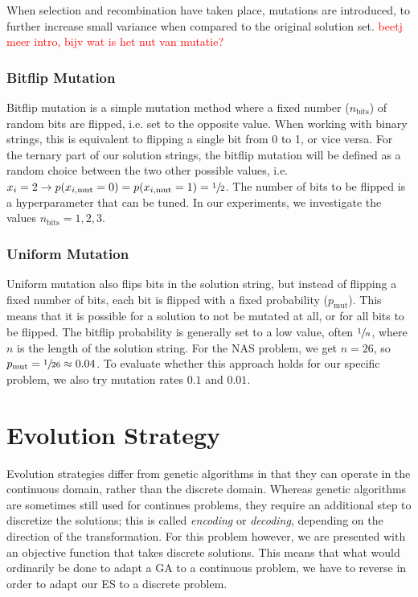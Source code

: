 \documentclass{article}
\newcommand{\todo}[1]{\textcolor{red}{#1}}
\begin{document}
When selection and recombination have taken place, mutations are introduced, to further increase small variance when compared to the original solution set.
\todo{beetj meer intro, bijv wat is het nut van mutatie?}

\subsubsection*{Bitflip Mutation}
\label{subsubsec:ga_mut_bf}
Bitflip mutation is a simple mutation method where a fixed number ($n_{\mathrm{bits}}$) of random bits are flipped, i.e. set to the opposite value.
When working with binary strings, this is equivalent to flipping a single bit from 0 to 1, or vice versa.
For the ternary part of our solution strings, the bitflip mutation will be defined as a random choice between the two other possible values, i.e. $ x_i = 2 \rightarrow p(x_{i,\mathrm{mut}} = 0) = p(x_{i, \mathrm{mut}} = 1) = \sfrac{1}{2}$.
The number of bits to be flipped is a hyperparameter that can be tuned.
In our experiments, we investigate the values $n_{\mathrm{bits}}=1, 2, 3$.

\subsubsection*{Uniform Mutation}
\label{subsubsec:ga_mut_um}
Uniform mutation also flips bits in the solution string, but instead of flipping a fixed number of bits, each bit is flipped with a fixed probability ($p_{\mathrm{mut}}$).
This means that it is possible for a solution to not be mutated at all, or for all bits to be flipped.
The bitflip probability is generally set to a low value, often $\sfrac{1}{n}$, where $n$ is the length of the solution string.
For the NAS problem, we get $n=26$, so $p_{\mathrm{mut}} = \sfrac{1}{26} \approx 0.04$.
To evaluate whether this approach holds for our specific problem, we also try mutation rates $0.1$ and $0.01$.



\section{Evolution Strategy}
\label{sec:ES}

Evolution strategies differ from genetic algorithms in that they can operate in the continuous domain, rather than the discrete domain.
Whereas genetic algorithms are sometimes still used for continues problems, they require an additional step to discretize the solutions; this is called \textit{encoding} or \textit{decoding}, depending on the direction of the transformation.
For this problem however, we are presented with an objective function that takes discrete solutions.
This means that what would ordinarily be done to adapt a GA to a continuous problem, we have to reverse in order to adapt our ES to a discrete problem.
\end{document}
